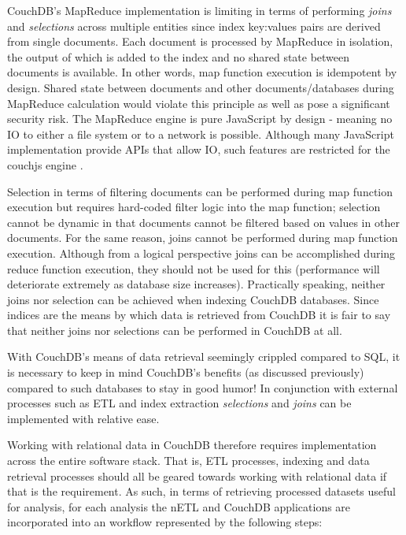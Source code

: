 \label{chapter-analysis}
CouchDB's MapReduce implementation is limiting in terms of performing \textit{joins} and \textit{selections} across multiple entities since index key:values pairs are derived from single documents. Each document is processed by MapReduce in isolation, the output of which is added to the index and no shared state between documents is available. In other words, map function execution is idempotent by design. Shared state between documents and other documents/databases during MapReduce calculation would violate this principle as well as pose a significant security risk. The MapReduce engine is pure JavaScript by design - meaning no IO to either a file system or to a network is possible. Although many JavaScript implementation provide APIs that allow IO, such features are restricted for the couchjs engine \cite{slack28Feb}.

Selection in terms of filtering documents can be performed during map function execution but requires hard-coded filter logic into the map function; selection cannot be dynamic in that documents cannot be filtered based on values in other documents. For the same reason, joins cannot be performed during map function execution. Although from a logical perspective joins can be accomplished during reduce function execution, they should not be used for this (performance will deteriorate extremely as database size increases). Practically speaking, neither joins nor selection can be achieved when indexing CouchDB databases. Since indices are the means by which data is retrieved from CouchDB it is fair to say that neither joins nor selections can be performed in CouchDB at all.

With CouchDB's means of data retrieval seemingly crippled compared to SQL, it is necessary to keep in mind CouchDB's benefits (as discussed previously) compared to such databases to stay in good humor! In conjunction with external processes such as ETL and index extraction \textit{selections} and \textit{joins} can be implemented with relative ease.

Working with relational data in CouchDB therefore requires implementation across the entire software stack. That is, ETL processes, indexing and data retrieval processes should all be geared towards working with relational data if that is the requirement. As such, in terms of retrieving processed datasets useful for analysis, for each analysis the nETL and CouchDB applications are incorporated into an workflow represented by the following steps:

